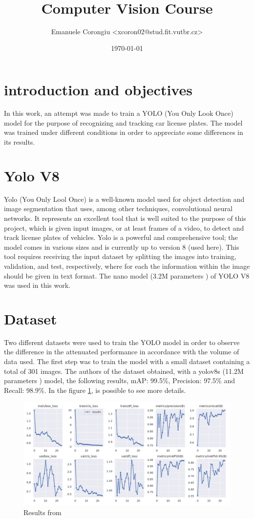 \documentclass[12pt]{article}
\title{\textbf{Computer Vision Course}}
\author{Emanuele Corongiu <xcoron02@stud.fit.vutbr.cz>}
\date{\today}
\begin{document}


\section{introduction and objectives}
In this work, an attempt was made to train a YOLO (You Only Look Once) model for the purpose of recognizing and tracking car license plates. The model was trained under different conditions in order to appreciate some differences in its results.


\section{Yolo V8}
Yolo (You Only Lool Once)\cite{yolo1} is a well-known model used for object detection and image segmentation that uses, among other techniques, convolutional neural networks\cite{CV_course_slide}. It represents an excellent tool that is well suited to the purpose of this project, which is given input images, or at least frames of a video, to detect and track license plates of vehicles. Yolo is a powerful and comprehensive tool; the model comes in various sizes and is currently up to version 8 (used here). This tool requires receiving the input dataset by splitting the images into training, validation, and test, respectively, where for each the information within the image should be given in text format. The nano model (3.2M parameters \cite{yolo1}) of YOLO V8 was used in this work.
\clearpage
\section{Dataset}
Two different datasets were used to train the YOLO model in order to observe the difference in the attenuated performance in accordance with the volume of data used. The first step was to train the model with a small dataset\cite{carplate-xuk6s_dataset} containing a total of 301 images. The authors of the dataset obtained, with a yolov8s (11.2M parameters \cite{yolo1}) model, the following results, mAP: 99.5\%, Precision: 97.5\% and Recall: 98.9\%. In the figure \ref{fig:mesh1}, is possible to see more details.

\begin{figure}[H]
    \centering
    \includegraphics[width=1\linewidth]{results_small dataset.png}
    \caption{Results from \cite{carplate-xuk6s_dataset}}
    \label{fig:mesh1}
\end{figure}
\end{document}

